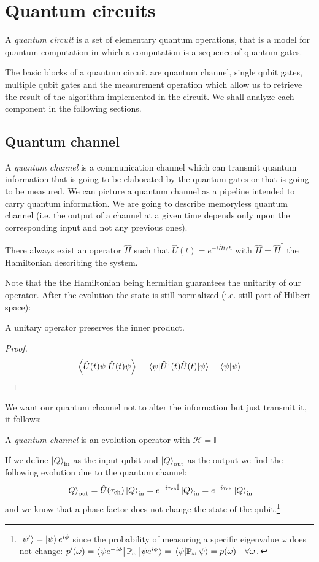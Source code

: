 \section{Quantum circuits}
A \emph{quantum circuit} is a set of elementary quantum operations, that is a model for quantum computation in which a computation is a sequence of quantum gates.

The basic blocks of a quantum circuit are quantum channel, single qubit gates, multiple qubit gates and the measurement operation which allow us to retrieve the result of the algorithm implemented in the circuit. We shall analyze each component in the following sections.
\subsection{Quantum channel}
A \emph{quantum channel} is a communication channel which can transmit quantum information that is going to be elaborated by the quantum gates or that is going to be measured. We can picture a quantum channel as a pipeline intended to carry quantum information. We are going to describe memoryless quantum channel (i.e. the output of a channel at a given time depends only upon the corresponding input and not any previous ones).
\begin{theorem}
There always exist an operator $\hat{H}$ such that $\hat{U}(t) = e^{-i\hat{H}t/\hbar}$ with $\hat{H} = \hat{H}^\dagger$ the Hamiltonian describing the system. \cite[p.145]{Shankar}
\end{theorem}
Note that the the Hamiltonian being hermitian guarantees the unitarity of our operator. After the evolution the state is still normalized (i.e. still part of Hilbert space):
\begin{theorem}
A unitary operator preserves the inner product.
\end{theorem}
\begin{proof}
\begin{equation*}
    \bra{\hat{U}(t)\psi}\ket{\hat{U}(t)\psi} = \expval{\hat{U}^\dagger(t)\hat{U}(t)}{\psi} = \braket{\psi}
\end{equation*}
\end{proof}
We want our quantum channel not to alter the information but just transmit it, it follows:
\begin{defn}
A \emph{quantum channel} is an evolution operator with $\mathcal{H}=\mathbb{I}$
\end{defn}
If we define $\ket{Q}_\text{in}$ as the input qubit and $\ket{Q}_\text{out}$ as the output we find the following evolution due to the quantum channel:
\begin{equation*}
    \ket{Q}_\text{out} = \hat{U}(\tau_\text{ch}) \ket{Q}_\text{in} = e^{-i\tau_\text{ch}\hat{\mathbb{I}}} \ket{Q}_\text{in} = e^{-i\tau_\text{ch}} \ket{Q}_\text{in}
\end{equation*}
and we know that a phase factor does not change the state of the qubit.\footnote{$\ket{\psi'}= \ket{\psi}e^{i\phi}$ since the probability of measuring a specific eigenvalue $\omega$ does not change: $p'(\omega) = \bra{\psi e^{-i\phi}}\mathbb{P}_\omega\ket{\psi e^{i\phi}} = \expval{\mathbb{P}_\omega}{\psi} = p(\omega) \quad \forall \omega\,.$}
